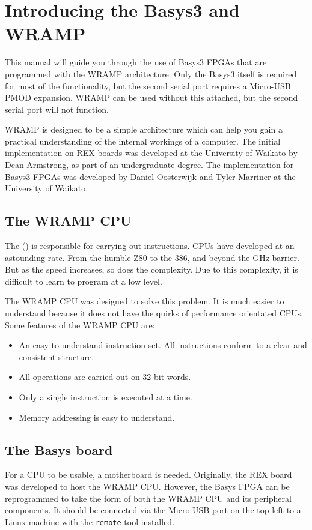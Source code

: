 \section{Introducing the Basys3 and WRAMP}

This manual will guide you through the use of Basys3 FPGAs that are programmed
with the WRAMP architecture. Only the Basys3 itself is required for most of the
functionality, but the second serial port requires a Micro-USB PMOD expansion.
WRAMP can be used without this attached, but the second serial port will not function.

WRAMP is designed to be a simple architecture which can help you gain a practical
understanding of the internal workings of a computer. The initial implementation
on REX boards was developed at the University of Waikato by Dean Armstrong, as
part of an undergraduate degree. The implementation for Basys3 FPGAs was developed
by Daniel Oosterwijk and Tyler Marriner at the University of Waikato.

\subsection{The WRAMP CPU}
The  () is responsible for carrying out 
instructions.
CPUs have developed at an astounding rate. From the humble Z80 to the 386, and
beyond the GHz barrier. But as the speed increases, so does
the complexity. Due to this complexity, it is difficult to learn to program
at a low level. 

The WRAMP CPU was designed to solve this problem. It is much easier to 
understand because it does not have the quirks of performance orientated CPUs.
Some features of the WRAMP CPU are:
\begin{itemize}
    \item An easy to understand instruction set. All instructions conform
            to a clear and consistent structure.
    \item All operations are carried out on 32-bit words.
    \item Only a single instruction is executed at a time.
    \item Memory addressing is easy to understand.
\end{itemize}

\subsection{The Basys board}
For a CPU to be usable, a motherboard is needed. Originally, the REX board was
developed to host the WRAMP CPU. However, the Basys FPGA can be reprogrammed
to take the form of both the WRAMP CPU and its peripheral components.
It should be connected via the Micro-USB port on the top-left to a Linux machine
with the \texttt{remote} tool installed.

